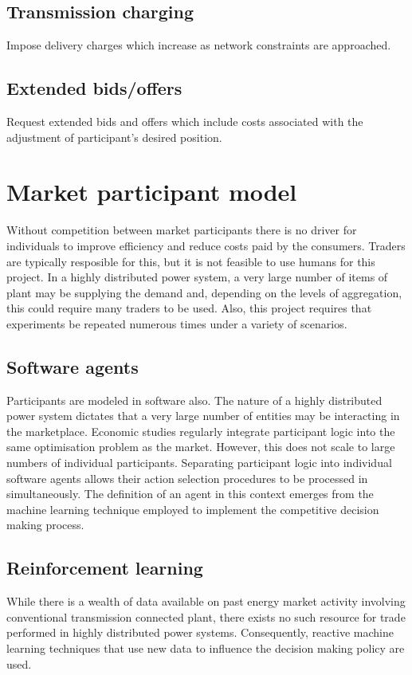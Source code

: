 \subsection{Transmission charging}
Impose delivery charges which increase as network constraints are approached.


\subsection{Extended bids/offers}
Request extended bids and offers which include costs associated with the
adjustment of participant's desired position.


\section{Market participant model}
Without competition between market participants there is no driver for
individuals to improve efficiency and reduce costs paid by the consumers.
Traders are typically resposible for this, but it is not feasible to use
humans for this project.  In a highly distributed power system, a very large
number of items of plant may be supplying the demand and, depending on the
levels of aggregation, this could require many traders to be used.  Also, this
project requires that experiments be repeated numerous times under a variety
of scenarios.

\subsection{Software agents}
Participants are modeled in software also.  The nature of a highly distributed
power system dictates that a very large number of entities may be interacting
in the marketplace.  Economic studies regularly integrate participant logic
into the same optimisation problem as the market.  However, this does not
scale to large numbers of individual participants.  Separating participant
logic into individual software agents allows their action selection procedures
to be processed in simultaneously.  The definition of an agent in this context
emerges from the machine learning technique employed to implement the
competitive decision making process.

\subsection{Reinforcement learning}
While there is a wealth of data available on past energy market activity
involving conventional transmission connected plant, there exists no such
resource for trade performed in highly distributed power systems.
Consequently, reactive machine learning techniques that use new data to
influence the decision making policy are used.

